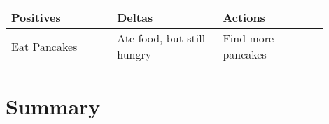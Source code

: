 \documentclass[draftclsnofoot,onecolumn,letterpaper,10pt]{IEEEtran}
\begin{document}
\begin{center}
	\begin{tabular}{p{0.3\linewidth} p{0.3\linewidth} p{0.3\linewidth}}
		\toprule
		\textbf{Positives} & \textbf{Deltas} & \textbf{Actions} \\
		\midrule

		Eat Pancakes & Ate food, but still hungry & Find more pancakes \\

		\bottomrule
	\end{tabular}
\end{center}


%
%

\section{Summary}
\end{document}
